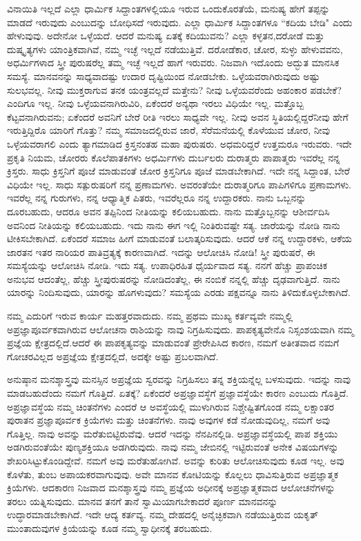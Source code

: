 ವಿನಾಯಿತಿ ಇಲ್ಲದೆ ಎಲ್ಲಾ ಧಾರ್ಮಿಕ ಸಿದ್ದಾಂತಗಳಲ್ಲಿಯೂ ಇರುವ ಒಂದು\break ಕೊರತೆಯೆ, ಮನುಷ್ಯ ಹೇಗೆ ತಪ್ಪನ್ನು ಮಾಡದೆ ಇರುವುದು ಎಂಬುದನ್ನು ಬೋಧಿಸದೆ ಇರುವುದು. ಎಲ್ಲಾ ಧಾರ್ಮಿಕ ಸಿದ್ದಾಂತಗಳೂ “ಕದಿಯ ಬೇಡಿ" ಎಂದು ಹೇಳುವುವು. ಅದೇನೋ ಒಳ್ಳೆಯದೆ. ಆದರೆ ಮನುಷ್ಯ ಏತಕ್ಕೆ ಕದಿಯುವನು? ಎಲ್ಲಾ ಕಳ್ಳತನ,\break ದರೋಡೆ ಮತ್ತು ದುಷ್ಕೃತ್ಯಗಳು ಯಾಂತ್ರಿಕವಾಗಿವೆ, ನಮ್ಮ ಇಚ್ಛೆ ಇಲ್ಲದೆ ನಡೆಯುತ್ತಿವೆ. ದರೋಡೆಕಾರ, ಚೋರ, ಸುಳ್ಳು ಹೇಳುವವನು, ಅಧರ್ಮಿಗಳಾದ ಸ್ತ್ರೀ ಪುರುಷರೆಲ್ಲ ತಮ್ಮ ಇಚ್ಛೆ ಇಲ್ಲದೆ ಹಾಗೆ ಇರುವರು. ನಿಜವಾಗಿ ಇದೊಂದು ಅದ್ಭುತ ಮಾನಸಿಕ ಸಮಸ್ಯೆ. ಮಾನವನನ್ನು ಸಾಧ್ಯವಾದಷ್ಟು ಉದಾರ ದೃಷ್ಟಿಯಿಂದ ನೋಡಬೇಕು. ಒಳ್ಳೆಯವರಾಗಿರುವುದು ಅಷ್ಟು ಸುಲಭವಲ್ಲ. ನೀವು ಮುಕ್ತರಾಗುವ ತನಕ ಯಂತ್ರವಲ್ಲದೆ ಮತ್ತೇನು? ನೀವು ಒಳ್ಳೆಯವರೆಂದು ಅಹಂಕಾರ ಪಡಬೇಕೆ? ಎಂದಿಗೂ ಇಲ್ಲ. ನೀವು ಒಳ್ಳೆಯವನಾಗಿರುವಿರಿ, ಏಕೆಂದರೆ ಅನ್ಯಥಾ ಇರಲು ವಿಧಿಯೇ ಇಲ್ಲ. ಮತ್ತೊಬ್ಬ ಕೆಟ್ಟವನಾಗಿರುವನು; ಏಕೆಂದರೆ ಅವನಿಗೆ ಬೇರೆ ರೀತಿ ಇರಲು ಸಾಧ್ಯವೇ ಇಲ್ಲ. ನೀವು ಅವನ ಸ್ಥಿತಿಯಲ್ಲಿದ್ದರೆ\break ನೀವು ಹೇಗೆ ಇರುತ್ತಿದ್ದಿರೊ ಯಾರಿಗೆ ಗೊತ್ತು? ನಮ್ಮ ಸಮಾಜದಲ್ಲಿರುವ ಜಾರೆ, ಸೆರೆಮನೆಯಲ್ಲಿ ಕೊಳೆಯುವ ಚೋರ, ನೀವು ಒಳ್ಳೆಯವರಾಗಲಿ ಎಂದು ತ್ಯಾಗಮಾಡಿದ ಕ್ರಿಸ್ತನಂತಹ ಮಹಾ ಪುರುಷರು. ಅಧಮರಿದ್ದರೆ ಉತ್ತಮರೂ ಇರುವರು. ಇದೇ ಪ್ರಕೃತಿ ನಿಯಮ, ಚೋರರು ಕೊಲೆಪಾತಕಿಗಳು ಅಧರ್ಮಿಗಳು ದುರ್ಬಲರು ದುರಾತ್ಮರು ಪಾಪಾತ್ಮರು ಇವರೆಲ್ಲ ನನ್ನ ಕ್ರಿಸ್ತರು. ಸಾಧು ಕ್ರಿಸ್ತನಿಗೆ ಪೂಜೆ ಮಾಡುವಂತೆ ಚೋರ ಕ್ರಿಸ್ತನಿಗೂ ಪೂಜೆ ಮಾಡಬೇಕಾಗಿದೆ. ಇದೇ ನನ್ನ ಸಿದ್ದಾಂತ, ಬೇರೆ ವಿಧಿಯೇ ಇಲ್ಲ. ಸಾಧು ಸತ್ಪುರುಷರಿಗೆ ನನ್ನ ಪ್ರಣಾಮಗಳು. ಅವರಂತೆಯೇ ದುರಾತ್ಮರಿಗೂ ಪಾಪಿಗಳಿಗೂ ಪ್ರಣಾಮಗಳು. ಇವರೆಲ್ಲ ನನ್ನ ಗುರುಗಳು, ನನ್ನ ಆಧ್ಯಾತ್ಮಿಕ ಪಿತರು, ಇವರೆಲ್ಲರೂ ನನ್ನ ಉದ್ದಾರಕರು. ನಾನು ಒಬ್ಬನನ್ನು ದೂರಬಹುದು, ಆದರೂ ಅವನ ತಪ್ಪಿನಿಂದ ನೀತಿಯನ್ನು ಕಲಿಯಬಹುದು. ನಾನು ಮತ್ತೊಬ್ಬನನ್ನು ಆಶೀರ್ವದಿಸಿ ಅವನಿಂದ ನೀತಿಯನ್ನು ಕಲಿಯಬಹುದು. ಇದು ನಾನು ಈಗ ಇಲ್ಲಿ ನಿಂತಿರುವಷ್ಟೇ ಸತ್ಯ. ಜಾರೆಯನ್ನು ನೋಡಿ ನಾನು ಟೀಕಿಸಬೇಕಾಗಿದೆ. ಏಕೆಂದರೆ ಸಮಾಜ ಹೀಗೆ ಮಾಡುವಂತೆ ಬಲಾತ್ಕರಿಸುವುದು. ಆದರೆ ಆಕೆ ನನ್ನ ಉದ್ದಾರಕಳು, ಆಕೆಯ ಜಾರತನ ಇತರ ನಾರಿಯರ ಪಾತಿವ್ರತ್ಯಕ್ಕೆ ಕಾರಣವಾಗಿದೆ. ಇದನ್ನು ಆಲೋಚಿಸಿ ನೋಡಿ! ಸ್ತ್ರೀ ಪುರುಷರೆ, ಈ ಸಮಸ್ಯೆಯನ್ನು ಆಲೋಚಿಸಿ ನೋಡಿ. ಇದು ಸತ್ಯ. ಉಪಾಧಿರಹಿತ ಧೈರ್ಯವಾದ ಸತ್ಯ. ನನಗೆ ಹೆಚ್ಚು ಪ್ರಾಪಂಚಿಕ ಅನುಭವ ಆದಂತೆಲ್ಲ, ಹೆಚ್ಚು ಸ್ತ್ರೀಪುರುಷರನ್ನು ನೋಡಿದಂತೆಲ್ಲ, ಈ ನಂಬಿಕೆ ನನ್ನಲ್ಲಿ ಹೆಚ್ಚು ದೃಢವಾಗುತ್ತಿದೆ. ನಾನು ಯಾರನ್ನು ನಿಂದಿಸುವುದು, ಯಾರನ್ನು ಹೊಗಳುವುದು? ಸಮಸ್ಯೆಯ ಎರಡು ಪಕ್ಷವನ್ನೂ ನಾನು ತಿಳಿದುಕೊಳ್ಳಬೇಕಾಗಿದೆ.

ನಮ್ಮ ಎದುರಿಗೆ ಇರುವ ಕಾರ್ಯ ಮಹತ್ತರವಾದುದು. ನಮ್ಮ ಪ್ರಥಮ ಮುಖ್ಯ ಕರ್ತವ್ಯವೇ ನಮ್ಮಲ್ಲಿ ಅಪ್ರಜ್ಞಾಪೂರ್ವಕವಾಗಿರುವ ಆಲೋಚನಾ ರಾಶಿಯನ್ನು ನಾವು ನಿಗ್ರಹಿಸುವುದು. ಪಾಪಕೃತ್ಯವೇನೊ ನಿಸ್ಸಂಶಯವಾಗಿ ನಮ್ಮ ಪ್ರಜ್ಞೆಯ ಕ್ಷೇತ್ರದಲ್ಲಿದೆ.\break ಆದರೆ ಈ ಪಾಪಕೃತ್ಯವನ್ನು ಮಾಡುವಂತೆ ಪ್ರೇರೇಪಿಸಿದ ಕಾರಣ, ನಮಗೆ ಅತೀತವಾದ ನಮಗೆ ಗೋಚರವಿಲ್ಲದ ಅಪ್ರಜ್ಞೆಯ ಕ್ಷೇತ್ರದಲ್ಲಿದೆ, ಅದಕ್ಕೇ ಅಷ್ಟು ಪ್ರಬಲವಾಗಿದೆ.

ಅನುಷ್ಠಾನ ಮನಶ್ಶಾಸ್ತ್ರವು ಮನಸ್ಸಿನ ಅಪ್ರಜ್ಞೆಯ ಸ್ವರವನ್ನು ನಿಗ್ರಹಿಸಲು ತನ್ನ ಶಕ್ತಿಯನ್ನೆಲ್ಲ ಬಳಸುವುದು. ಇದನ್ನು ನಾವು ಮಾಡಬಹುದೆಂದು ನಮಗೆ ಗೊತ್ತಿದೆ. ಏತಕ್ಕೆ? ಏಕೆಂದರೆ ಅಪ್ರಜ್ಞಾವಸ್ಥೆಗೆ ಪ್ರಜ್ಞಾವಸ್ಥೆಯೇ ಕಾರಣ ಎಂಬುದು ಗೊತ್ತಿದೆ. ಅಪ್ರಜ್ಞಾವಸ್ಥೆಯ ನಮ್ಮ ಚಿಂತನೆಗಳು ಎಂದರೆ ಆ ಅವಸ್ಥೆಯಲ್ಲಿ ಮುಳುಗಿರುವ ನಿಶ್ಚೇಷ್ಟಿತಗೊಂಡ ನಮ್ಮ ಲಕ್ಷಾಂತರ ಪುರಾತನ ಪ್ರಜ್ಞಾಪೂರ್ವಕ ಕ್ರಿಯೆಗಳು ಮತ್ತು ಚಿಂತನೆಗಳು. ನಾವು ಅವುಗಳ ಕಡೆ ನೋಡುವುದಿಲ್ಲ, ನಮಗೆ ಅವು ಗೊತ್ತಿಲ್ಲ. ನಾವು ಅವನ್ನು ಮರೆತುಬಿಟ್ಟಿರುವೆವು. ಆದರೆ ಇದನ್ನು ನೆನಪಿನಲ್ಲಿಡಿ. ಅಪ್ರಜ್ಞಾವಸ್ಥೆಯಲ್ಲಿ ಪಾಪ ಶಕ್ತಿಯು ಅಡಗಿರುವಂತೆಯೇ ಪುಣ್ಯಶಕ್ತಿಯೂ ಅಡಗಿರುವುದು. ನಾವು ನಮ್ಮ ಜೇಬಿನಲ್ಲಿ ಇಟ್ಟಿರುವಂತೆ ಅನೇಕ ವಿಷಯಗಳನ್ನು ಶೇಖರಿಸಿಟ್ಟುಕೊಂಡಿದ್ದೇವೆ. ನಮಗೆ ಅವು ಮರೆತುಹೋಗಿವೆ. ಅವನ್ನು ಕುರಿತು ಆಲೋಚಿಸುವುದು ಕೂಡ ಇಲ್ಲ. ಅವು ಕೊಳೆತು, ತುಂಬ ಅಪಾಯಕರವಾಗುವುವು. ಅವೇ ಮಾನವ ಕೋಟಿಯನ್ನು ಕೊಲ್ಲಲು ಧಾವಿಸುತ್ತಿರುವ ಅಪ್ರಜ್ಞಾತ್ಮಕ ಕ್ರಿಯೆಗಳು. ಆದಕಾರಣ ನಿಜವಾದ ಮನಶ್ಶಾಸ್ತ್ರವು ನಮ್ಮ ಪ್ರಜ್ಞೆಯ ಅಧೀನಕ್ಕೆ ಅಪ್ರಜ್ಞಾತ್ಮಕವಾದ ಆಲೋಚನೆಗಳನ್ನು ತರಲು ಯತ್ನಿಸುವುದು. ಮಾನವ ತನಗೆ ತಾನೆ ಸ್ವಾಮಿಯಾಗಬೇಕಾದರೆ ಪೂರ್ಣ ಮಾನವನನ್ನು ಉದ್ಧಾರಮಾಡಬೇಕಾಗಿದೆ. ಇದೇ ಆದ್ಯ ಕರ್ತವ್ಯ. ನಮ್ಮ ದೇಹದಲ್ಲಿ ಅನೈಚ್ಛಿಕವಾಗಿ ನಡೆಯುತ್ತಿರುವ ಯಕೃತ್ ಮುಂತಾದುವುಗಳ ಕ್ರಿಯೆಯನ್ನು ಕೂಡ ನಮ್ಮ ಸ್ವಾಧೀನಕ್ಕೆ ತರಬಹುದು.

